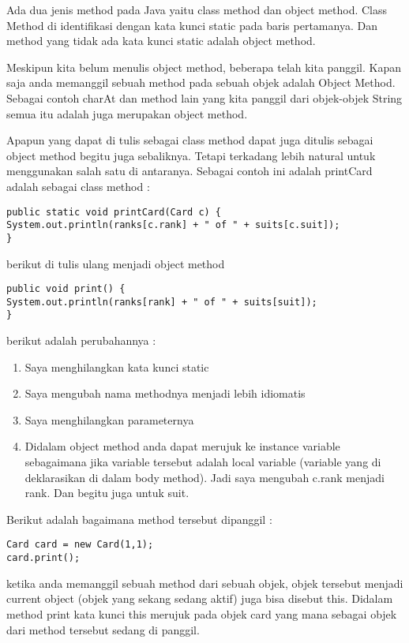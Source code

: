 Ada dua jenis method pada Java yaitu class method dan object method. Class Method di identifikasi dengan kata kunci static pada baris pertamanya. Dan method yang tidak ada kata kunci static adalah object method.

Meskipun kita belum menulis object method, beberapa telah kita panggil. Kapan saja anda memanggil sebuah method pada sebuah objek adalah Object Method. Sebagai contoh charAt dan method lain yang kita panggil dari objek-objek String semua itu adalah juga merupakan object method. 

Apapun yang dapat di tulis sebagai class method dapat juga ditulis sebagai object method begitu juga sebaliknya. Tetapi terkadang lebih natural untuk menggunakan salah satu di antaranya.
Sebagai contoh ini adalah printCard adalah sebagai class method :

\begin{lstlisting}
public static void printCard(Card c) {
System.out.println(ranks[c.rank] + " of " + suits[c.suit]);
}
\end{lstlisting}

berikut di tulis ulang menjadi object method 

\begin{lstlisting}
public void print() {
System.out.println(ranks[rank] + " of " + suits[suit]);
}
\end{lstlisting}

berikut adalah perubahannya :
\begin{enumerate}
	\item Saya menghilangkan kata kunci static
	\item Saya mengubah nama methodnya menjadi lebih idiomatis
	\item Saya menghilangkan parameternya
	\item Didalam object method anda dapat merujuk ke instance variable sebagaimana jika variable tersebut adalah local variable (variable yang di deklarasikan di dalam body method). Jadi saya mengubah c.rank menjadi rank. Dan begitu juga untuk suit.
\end{enumerate}

Berikut adalah bagaimana method tersebut dipanggil :
\begin{lstlisting}
Card card = new Card(1,1);
card.print();
\end{lstlisting}

ketika anda memanggil sebuah method dari sebuah objek, objek tersebut menjadi current object (objek yang sekang sedang aktif) juga bisa disebut this. Didalam method print kata kunci this merujuk pada objek card yang mana sebagai objek dari method tersebut sedang di panggil.

